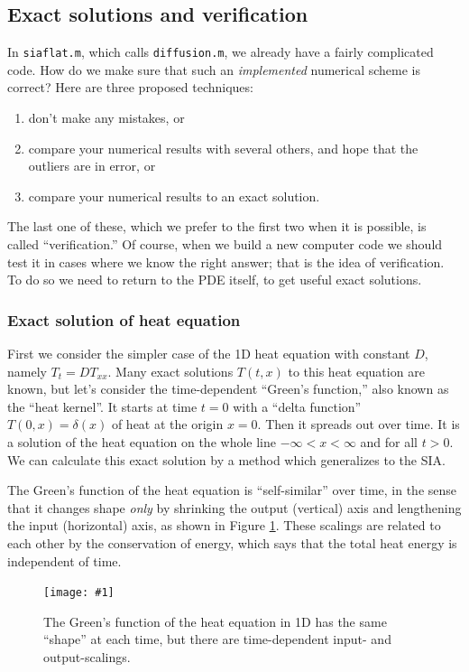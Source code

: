 \documentclass[titlepage,a4paper,final,12pt]{scrartcl}
\newcommand{\minput}[1]{
\bigskip
\begin{quote}
\bigskip
\VerbatimInput[frame=single,framesep=3mm,label=\fbox{\normalsize \textsl{\,#1.m\,}},fontfamily=courier,fontsize=\scriptsize]{../mfiles/#1.slim.m}
\bigskip
\end{quote}
}
\newcommand{\onefigsize}[3]{
\begin{figure}[ht]
\centering
\texttt{[image: \#1]}
\caption{#2}
\label{fig:#1}
\end{figure}}
\begin{document}
\minput{siaflat}


\subsection{Exact solutions and verification}

In \texttt{siaflat.m}, which calls \texttt{diffusion.m}, we already have a fairly complicated code.  How do we make sure that such an \emph{implemented} numerical scheme is correct?  Here are three proposed techniques:
\begin{enumerate}
  \item don't make any mistakes, or
  \item compare your numerical results with several others, and hope that the outliers are in error, or
  \item compare your numerical results to an exact solution.   \end{enumerate}
The last one of these, which we prefer to the first two when it is possible, is called ``verification.''  Of course, when we build a new computer code we should test it in cases where we know the right answer; that is the idea of verification.  To do so we need to return to the PDE itself, to get useful exact solutions.

\subsubsection*{Exact solution of heat equation}  First we consider the simpler case of the 1D heat equation with constant $D$, namely $T_t = D T_{xx}$.  Many exact solutions $T(t,x)$ to this heat equation are known, but let's consider the time-dependent ``Green's function,'' also known as the ``heat kernel''.  It starts at time $t=0$ with a ``delta function'' $T(0,x)=\delta(x)$ of heat at the origin $x=0$.  Then it spreads out over time.  It is a solution of the heat equation on the whole line $-\infty<x<\infty$ and for all $t>0$.  We can calculate this exact solution by a method which generalizes to the SIA.

The Green's function of the heat equation is ``self-similar'' over time, in the sense that it changes shape \emph{only} by shrinking the output (vertical) axis and lengthening the input (horizontal) axis, as shown in Figure \ref{fig:heatscaling}.  These scalings are related to each other by the conservation of energy, which says that the total heat energy is independent of time.

\onefigsize{heatscaling}{The Green's function of the heat equation in 1D has the same ``shape'' at each time, but there are time-dependent input- and output-scalings.}{2.4in}
\end{document}
